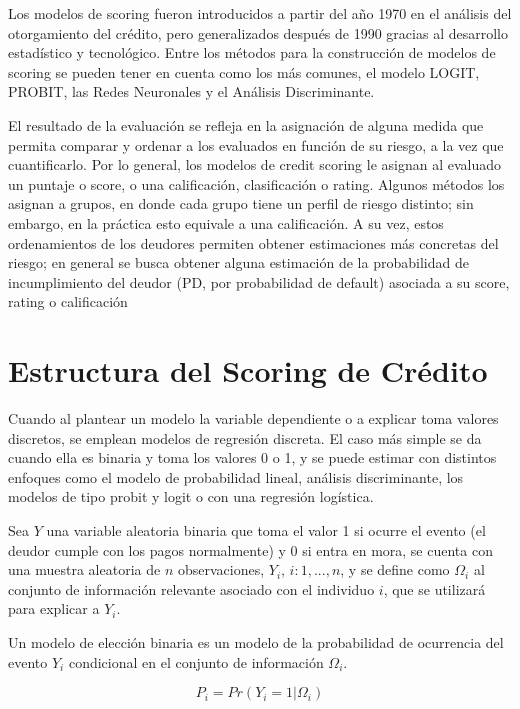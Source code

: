 \documentclass[
  12pt,
]{krantz}
\theoremstyle{definition}
\theoremstyle{definition}
\theoremstyle{definition}
\theoremstyle{remark}
\begin{document}
Los modelos de scoring fueron introducidos a partir del año 1970 en el análisis del otorgamiento del crédito, pero generalizados después de 1990 gracias al desarrollo estadístico y tecnológico. Entre los métodos para la construcción de modelos de scoring se pueden tener en cuenta como los más comunes, el modelo LOGIT, PROBIT, las Redes Neuronales y el Análisis Discriminante.

El resultado de la evaluación se refleja en la asignación de alguna medida que permita comparar y ordenar a los evaluados en función de su riesgo, a la vez que cuantificarlo. Por lo general, los modelos de credit scoring le asignan al evaluado un puntaje o score, o una calificación, clasificación o rating. Algunos métodos los asignan a grupos, en donde cada grupo tiene un perfil de riesgo distinto; sin embargo, en la práctica esto equivale a una calificación. A su vez, estos ordenamientos de los deudores permiten obtener estimaciones más concretas del riesgo; en general se busca obtener alguna estimación de la probabilidad de incumplimiento del deudor (PD, por probabilidad de default) asociada a su score, rating o calificación

\hypertarget{estructura-del-scoring-de-credito}{%
\section{Estructura del Scoring de Crédito}\label{estructura-del-scoring-de-credito}}

Cuando al plantear un modelo la variable dependiente o a explicar toma valores discretos, se emplean modelos de regresión discreta. El caso más simple se da cuando ella es binaria y toma los valores 0 o 1, y se puede estimar con distintos enfoques como el modelo de probabilidad lineal, análisis discriminante, los modelos de tipo probit y logit o con una regresión logística.

Sea \(Y\) una variable aleatoria binaria que toma el valor 1 si ocurre el evento (el deudor cumple con los pagos normalmente) y 0 si entra en mora, se cuenta con una muestra aleatoria de \(n\) observaciones, \(Y_i\), \(i: 1,...,n\), y se define como \(\Omega_i\) al conjunto de información relevante asociado con el individuo \(i\), que se utilizará para explicar a \(Y_i\).

Un modelo de elección binaria es un modelo de la probabilidad de ocurrencia del evento \(Y_i\) condicional en el conjunto de información \(\Omega_i\).

\begin{equation}
P_i = Pr(Y_i=1|\Omega_i)
\label{eq:ecuacion1} 
\end{equation}
\end{document}
